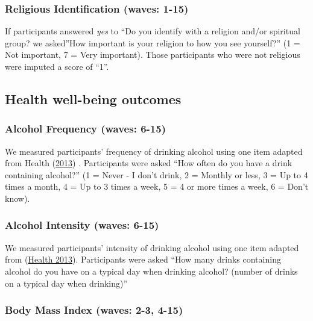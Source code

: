 \documentclass[
  singlecolumn]{report}
\begin{document}
\hypertarget{religious-identification-waves-1-15}{%
\subsubsection{Religious Identification (waves:
1-15)}\label{religious-identification-waves-1-15}}

If participants answered \emph{yes} to ``Do you identify with a religion
and/or spiritual group? we asked''How important is your religion to how
you see yourself?'' (1 = Not important, 7 = Very important). Those
participants who were not religious were imputed a score of ``1''.

\hypertarget{health-well-being-outcomes}{%
\subsection{Health well-being
outcomes}\label{health-well-being-outcomes}}

\hypertarget{alcohol-frequency-waves-6-15}{%
\subsubsection{Alcohol Frequency (waves:
6-15)}\label{alcohol-frequency-waves-6-15}}

We measured participants' frequency of drinking alcohol using one item
adapted from Health
(\protect\hyperlink{ref-Ministry_of_Health_2013}{2013}) . Participants
were asked ``How often do you have a drink containing alcohol?'' (1 =
Never - I don't drink, 2 = Monthly or less, 3 = Up to 4 times a month, 4
= Up to 3 times a week, 5 = 4 or more times a week, 6 = Don't know).

\hypertarget{alcohol-intensity-waves-6-15}{%
\subsubsection{Alcohol Intensity (waves:
6-15)}\label{alcohol-intensity-waves-6-15}}

We measured participants' intensity of drinking alcohol using one item
adapted from (\protect\hyperlink{ref-Ministry_of_Health_2013}{Health
2013}). Participants were asked ``How many drinks containing alcohol do
you have on a typical day when drinking alcohol? (number of drinks on a
typical day when drinking)''

\hypertarget{body-mass-index-waves-2-3-4-15}{%
\subsubsection{Body Mass Index (waves: 2-3,
4-15)}\label{body-mass-index-waves-2-3-4-15}}
\end{document}
